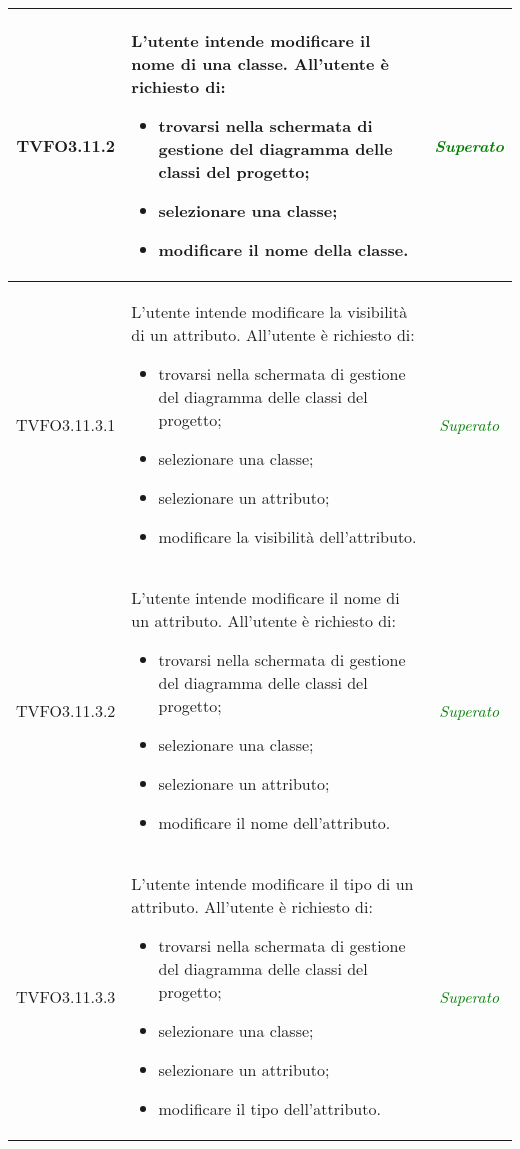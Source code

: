 \begin{longtable}{|c|>{}m{8cm}|c|}
\hypertarget{TVFO3.11.2}{TVFO3.11.2} & L'utente intende modificare il nome di una classe.
All'utente è richiesto di:
\begin{itemize}
	\item trovarsi nella schermata di gestione del diagramma delle classi del progetto;
	\item selezionare una classe;
	\item modificare il nome della classe.
\end{itemize} & \textcolor{Green}{\textit{Superato}}\\ \hline

\hypertarget{TVFO3.11.3.1}{TVFO3.11.3.1} & L'utente intende modificare la visibilità di un attributo.
All'utente è richiesto di:
\begin{itemize}
	\item trovarsi nella schermata di gestione del diagramma delle classi del progetto;
	\item selezionare una classe;
	\item selezionare un attributo;
	\item modificare la visibilità dell'attributo.
\end{itemize} & \textcolor{Green}{\textit{Superato}}\\ \hline

\hypertarget{TVFO3.11.3.2}{TVFO3.11.3.2} & L'utente intende modificare il nome di un attributo.
All'utente è richiesto di:
\begin{itemize}
	\item trovarsi nella schermata di gestione del diagramma delle classi del progetto;
	\item selezionare una classe;
	\item selezionare un attributo;
	\item modificare il nome dell'attributo.
\end{itemize} & \textcolor{Green}{\textit{Superato}}\\ \hline

\hypertarget{TVFO3.11.3.3}{TVFO3.11.3.3} & L'utente intende modificare il tipo di un attributo.
All'utente è richiesto di:
\begin{itemize}
	\item trovarsi nella schermata di gestione del diagramma delle classi del progetto;
	\item selezionare una classe;
	\item selezionare un attributo;
	\item modificare il tipo dell'attributo.
\end{itemize} & \textcolor{Green}{\textit{Superato}}\\ \hline


\end{longtable}
